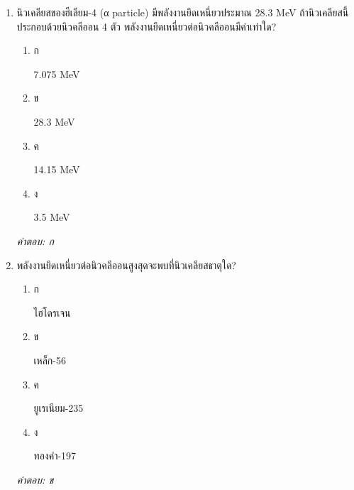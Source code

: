 \documentclass[12pt]{article}
\begin{document}
\begin{enumerate}[label=\arabic*., itemsep=0.5\baselineskip, topsep=0.5\baselineskip, leftmargin=*]
\item นิวเคลียสของฮีเลียม-4 (α particle) มีพลังงานยึดเหนี่ยวประมาณ 28.3 MeV ถ้านิวเคลียสนี้ประกอบด้วยนิวคลีออน 4 ตัว พลังงานยึดเหนี่ยวต่อนิวคลีออนมีค่าเท่าใด?
\begin{enumerate}[label=\alph*)., itemsep=0.3\baselineskip, topsep=0.3\baselineskip]
\item ก\ 
\begin{minipage}[t]{0.9\linewidth}
\raggedright 7.075 MeV
\end{minipage}
\item ข\ 
\begin{minipage}[t]{0.9\linewidth}
\raggedright 28.3 MeV
\end{minipage}
\item ค\ 
\begin{minipage}[t]{0.9\linewidth}
\raggedright 14.15 MeV
\end{minipage}
\item ง\ 
\begin{minipage}[t]{0.9\linewidth}
\raggedright 3.5 MeV
\end{minipage}
\end{enumerate}
\vspace{-0.3\baselineskip}
\begin{small}
\textit{คำตอบ: ก}
\end{small}

\item พลังงานยึดเหนี่ยวต่อนิวคลีออนสูงสุดจะพบที่นิวเคลียสธาตุใด?
\begin{enumerate}[label=\alph*)., itemsep=0.3\baselineskip, topsep=0.3\baselineskip]
\item ก\ 
\begin{minipage}[t]{0.9\linewidth}
\raggedright ไฮโดรเจน
\end{minipage}
\item ข\ 
\begin{minipage}[t]{0.9\linewidth}
\raggedright เหล็ก-56
\end{minipage}
\item ค\ 
\begin{minipage}[t]{0.9\linewidth}
\raggedright ยูเรเนียม-235
\end{minipage}
\item ง\ 
\begin{minipage}[t]{0.9\linewidth}
\raggedright ทองคำ-197
\end{minipage}
\end{enumerate}
\vspace{-0.3\baselineskip}
\begin{small}
\textit{คำตอบ: ข}
\end{small}


\end{enumerate}
\end{document}
